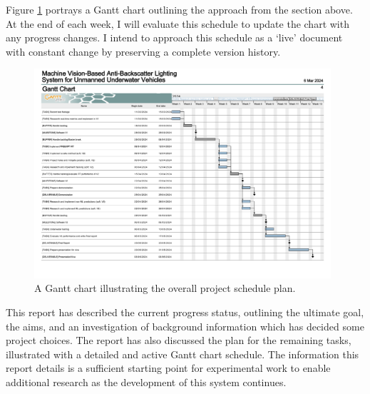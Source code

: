 Figure \ref{fig:gantt_chart} portrays a Gantt chart outlining the approach from the section above. At the end of each week, I will evaluate this schedule to update the chart with any progress changes. I intend to approach this schedule as a `live' document with constant change by preserving a complete version history.

\begin{figure}[h]
    \centering
    \includegraphics[width=0.98\textwidth]{assets/gantt_chart.png}
    \caption{A Gantt chart illustrating the overall project schedule plan.}
    \label{fig:gantt_chart}
\end{figure}

This report has described the current progress status, outlining the ultimate goal, the aims, and an investigation of background information which has decided some project choices. The report has also discussed the plan for the remaining tasks, illustrated with a detailed and active Gantt chart schedule. The information this report details is a sufficient starting point for experimental work to enable additional research as the development of this system continues.
